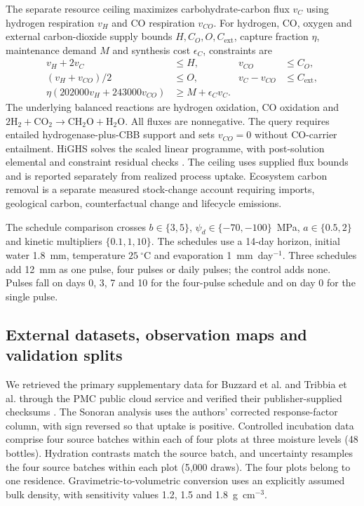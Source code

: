 \documentclass[11pt,a4paper]{article}
\begin{document}
The separate resource ceiling maximizes carbohydrate-carbon flux $v_C$ using hydrogen respiration $v_H$ and CO respiration $v_{CO}$. For hydrogen, CO, oxygen and external carbon-dioxide supply bounds $H,C_O,O,C_{\mathrm{ext}}$, capture fraction $\eta$, maintenance demand $M$ and synthesis cost $\epsilon_C$, constraints are
\begin{align}
v_H+2v_C&\leq H,& v_{CO}&\leq C_O,\\
(v_H+v_{CO})/2&\leq O,& v_C-v_{CO}&\leq C_{\mathrm{ext}},\\
\eta(202000v_H+243000v_{CO})&\geq M+\epsilon_Cv_C.
\end{align}
The underlying balanced reactions are hydrogen oxidation, CO oxidation and $2\mathrm{H_2}+\mathrm{CO_2}\rightarrow\mathrm{CH_2O}+\mathrm{H_2O}$. All fluxes are nonnegative. The query requires entailed hydrogenase-plus-CBB support and sets $v_{CO}=0$ without CO-carrier entailment. HiGHS solves the scaled linear programme, with post-solution elemental and constraint residual checks \cite{huangfu2018highs}. The ceiling uses supplied flux bounds and is reported separately from realized process uptake. Ecosystem carbon removal is a separate measured stock-change account requiring imports, geological carbon, counterfactual change and lifecycle emissions.

The schedule comparison crosses $b\in\{3,5\}$, $\psi_d\in\{-70,-100\}$~MPa, $a\in\{0.5,2\}$ and kinetic multipliers $\{0.1,1,10\}$. The schedules use a 14-day horizon, initial water 1.8~mm, temperature $25~^\circ$C and evaporation 1~mm~day$^{-1}$. Three schedules add 12~mm as one pulse, four pulses or daily pulses; the control adds none. Pulses fall on days 0, 3, 7 and 10 for the four-pulse schedule and on day 0 for the single pulse.

\subsection{External datasets, observation maps and validation splits}
We retrieved the primary supplementary data for Buzzard et al. and Tribbia et al. through the PMC public cloud service and verified their publisher-supplied checksums \cite{buzzard2022h2uptake,tribbia2026namib}. The Sonoran analysis uses the authors' corrected response-factor column, with sign reversed so that uptake is positive. Controlled incubation data comprise four source batches within each of four plots at three moisture levels (48 bottles). Hydration contrasts match the source batch, and uncertainty resamples the four source batches within each plot (5,000 draws). The four plots belong to one residence. Gravimetric-to-volumetric conversion uses an explicitly assumed bulk density, with sensitivity values 1.2, 1.5 and 1.8~g~cm$^{-3}$.
\end{document}
